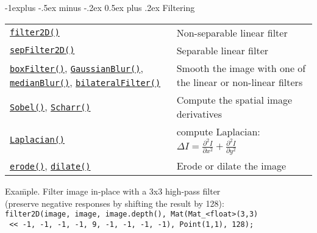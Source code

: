 \documentclass[10pt,landscape]{article}
\makeatletter
\renewcommand{\subsection}{\@startsection{subsection}{2}{0mm}%
                                {-1explus -.5ex minus -.2ex}%
                                {0.5ex plus .2ex}%
                                {\normalfont\normalsize\bfseries}}
\makeatother
\begin{document}
\begin{multicols}{3}
\subsection{Filtering}

\begin{tabular}{@{}p{\the\MyLen}%
                @{}p{\linewidth-\the\MyLen}@{}}
\texttt{\href{http://opencv.willowgarage.com/documentation/cpp/image_filtering.html\#cv-filter2d}{filter2D()}} & Non-separable linear filter \\

\texttt{\href{http://opencv.willowgarage.com/documentation/cpp/image_filtering.html\#cv-sepfilter2d}{sepFilter2D()}} & Separable linear filter \\

\texttt{\href{http://opencv.willowgarage.com/documentation/cpp/image_filtering.html\#cv-blur}{boxFilter()}},  \texttt{\href{http://opencv.willowgarage.com/documentation/cpp/image_filtering.html\#cv-gaussianblur}{GaussianBlur()}},
\texttt{\href{http://opencv.willowgarage.com/documentation/cpp/image_filtering.html\#cv-medianblur}{medianBlur()}},
\texttt{\href{http://opencv.willowgarage.com/documentation/cpp/image_filtering.html\#cv-bilateralfilter}{bilateralFilter()}}
& Smooth the image with one of the linear or non-linear filters \\

\texttt{\href{http://opencv.willowgarage.com/documentation/cpp/image_filtering.html\#cv-sobel}{Sobel()}},  \texttt{\href{http://opencv.willowgarage.com/documentation/cpp/image_filtering.html\#cv-scharr}{Scharr()}}
& Compute the spatial image derivatives \\
\texttt{\href{http://opencv.willowgarage.com/documentation/cpp/image_filtering.html\#cv-laplacian}{Laplacian()}} & compute Laplacian: $\Delta I = \frac{\partial ^ 2 I}{\partial x^2} + \frac{\partial ^ 2 I}{\partial y^2}$  \\

\texttt{\href{http://opencv.willowgarage.com/documentation/cpp/image_filtering.html\#cv-erode}{erode()}}, \texttt{\href{http://opencv.willowgarage.com/documentation/cpp/image_filtering.html\#cv-dilate}{dilate()}} & Erode or dilate the image \\

\end{tabular}

\begin{tabbing}
Exa\=mple. Filter image in-place with a 3x3 high-pass filter\\
\> (preserve negative responses by shifting the result by 128):\\
\texttt{filter2D(image, image, image.depth(), Mat(Mat\_<float>(3,3)}\\
\> \texttt{ << -1, -1, -1, -1, 9, -1, -1, -1, -1), Point(1,1), 128);}\\
\end{tabbing}


\end{multicols}
\end{document}
